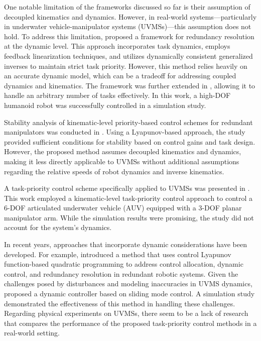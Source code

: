 One notable limitation of the frameworks discussed so far is their assumption 
of decoupled kinematics and dynamics. However, in real-world 
systems—particularly in underwater vehicle-manipulator systems (UVMSs)—this 
assumption does not hold. To address this limitation, \cite{khatib1987} 
proposed a framework for redundancy resolution at the dynamic level. This 
approach incorporates task dynamics, employs feedback linearization techniques, 
and utilizes dynamically consistent generalized inverses \cite{khatib1995} to 
maintain strict task priority. However, this method relies heavily on an 
accurate dynamic model, which can be a tradeoff for addressing coupled dynamics 
and kinematics. The framework was further extended in \cite{khatib2004,sentis2004}, 
allowing it to handle an arbitrary number of tasks effectively. In this work, a 
high-DOF humanoid robot was successfully controlled in a simulation study.

Stability analysis of kinematic-level priority-based control schemes for 
redundant manipulators was conducted in \cite{antonelli2009}. Using a 
Lyapunov-based approach, the study provided sufficient conditions for stability 
based on control gains and task design. However, the proposed method assumes 
decoupled kinematics and dynamics, making it less directly applicable to UVMSs 
without additional assumptions regarding the relative speeds of robot dynamics 
and inverse kinematics.

A task-priority control scheme specifically applied to UVMSs was presented in 
\cite{antonelli1998}. This work employed a kinematic-level task-priority 
control approach to control a 6-DOF articulated underwater vehicle (AUV) 
equipped with a 3-DOF planar manipulator arm. While the simulation results were 
promising, the study did not account for the system's dynamics.

In recent years, approaches that incorporate dynamic considerations have been 
developed. For example, \cite{basso2020} introduced a method that uses control 
Lyapunov function-based quadratic programming to address control allocation, 
dynamic control, and redundancy resolution in redundant robotic systems. Given 
the challenges posed by disturbances and modeling inaccuracies in UVMS 
dynamics, \cite{iversflaten2022} proposed a dynamic controller based on sliding 
mode control. A simulation study demonstrated the effectiveness of this method 
in handling these challenges. Regarding physical experiments on UVMSs, there 
seem to be a lack of research that compares the performance of the proposed 
task-priority control methods in a real-world setting.



